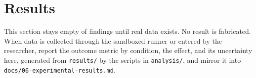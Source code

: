 \section{Results}

This section stays empty of findings until real data exists. No result is
fabricated. When data is collected through the sandboxed runner or entered by
the researcher, report the outcome metric by condition, the effect, and its
uncertainty here, generated from \texttt{results/} by the scripts in
\texttt{analysis/}, and mirror it into \texttt{docs/06-experimental-results.md}.
